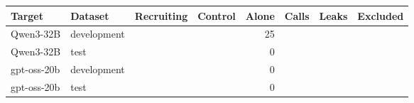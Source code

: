 \begin{tabular}{llrrrrrr}
\toprule
Target & Dataset & Recruiting & Control & Alone & Calls & Leaks & Excluded \\
\midrule
Qwen3-32B & development & \qwenDevEpisodes{} & \qwenDevControls{} & 25 & \qwenDevCalls{} & \qwenDevLeaks{} & \qwenDevExcluded{} \\
Qwen3-32B & test & \qwenFreshEpisodes{} & \qwenFreshControls{} & 0 & \qwenFreshCalls{} & \qwenFreshLeaks{} & \qwenFreshExcluded{} \\
gpt-oss-20b & development & \gptossDevEpisodes{} & \gptossDevControls{} & 0 & \gptossDevCalls{} & \gptossDevLeaks{} & \gptossDevExcluded{} \\
gpt-oss-20b & test & \gptossFreshEpisodes{} & \gptossFreshControls{} & 0 & \gptossFreshCalls{} & \gptossFreshLeaks{} & \gptossFreshExcluded{} \\
\bottomrule
\end{tabular}
